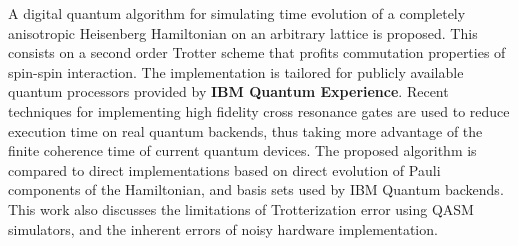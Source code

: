 A digital quantum algorithm for simulating time evolution of a completely anisotropic Heisenberg Hamiltonian on an arbitrary lattice is proposed. This consists on a second order Trotter scheme that profits commutation properties of spin-spin interaction. The implementation is tailored for publicly available quantum processors provided by \textbf{IBM Quantum Experience}. Recent techniques for implementing high fidelity cross resonance gates are used to reduce execution time on real quantum backends, thus taking more advantage of the finite coherence time of current quantum devices. The proposed algorithm is compared to direct implementations based on direct evolution of Pauli components of the Hamiltonian, and basis sets used by IBM Quantum backends. This work also discusses the limitations of Trotterization error using QASM simulators, and the inherent errors of noisy hardware implementation.